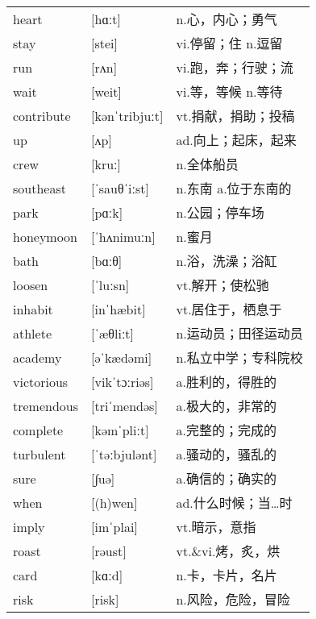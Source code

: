 \documentclass[a4paper]{article}
\begin{document}
\section{}
\begin{tabular}{l l l}

heart & [hɑːt] & n.心，内心；勇气 \\
stay & [stei] & vi.停留；住 n.逗留 \\
run & [rʌn] & vi.跑，奔；行驶；流 \\
wait & [weit] & vi.等，等候 n.等待 \\
contribute & [kənˈtribjuːt] & vt.捐献，捐助；投稿 \\
up & [ʌp] & ad.向上；起床，起来 \\
crew & [kruː] & n.全体船员 \\
southeast & [ˈsauθˈiːst] & n.东南 a.位于东南的 \\
park & [pɑːk] & n.公园；停车场 \\
honeymoon & [ˈhʌnimuːn] & n.蜜月 \\
bath & [bɑːθ] & n.浴，洗澡；浴缸 \\
loosen & [ˈluːsn] & vt.解开；使松驰 \\
inhabit & [inˈhæbit] & vt.居住于，栖息于 \\
athlete & [ˈæθliːt] & n.运动员；田径运动员 \\
academy & [əˈkædəmi] & n.私立中学；专科院校 \\
victorious & [vikˈtɔːriəs] & a.胜利的，得胜的 \\
tremendous & [triˈmendəs] & a.极大的，非常的 \\
complete & [kəmˈpliːt] & a.完整的；完成的 \\
turbulent & [ˈtəːbjulənt] & a.骚动的，骚乱的 \\
sure & [∫uə] & a.确信的；确实的 \\
when & [(h)wen] & ad.什么时候；当…时 \\
imply & [imˈplai] & vt.暗示，意指 \\
roast & [rəust] & vt.\&vi.烤，炙，烘 \\
card & [kɑːd] & n.卡，卡片，名片 \\
risk & [risk] & n.风险，危险，冒险 \\

\end{tabular}
\end{document}
